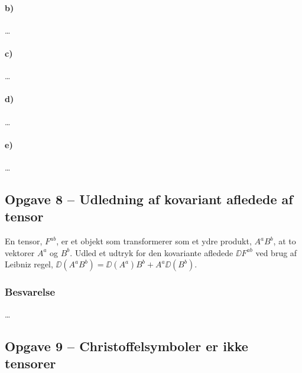 \documentclass[../main.tex]{subfiles}
\begin{document}
\paragraph{b)}

\ldots



\paragraph{c)}

\ldots



\paragraph{d)}

\ldots



\paragraph{e)}

\ldots




\subsection{Opgave 8 -- Udledning af kovariant afledede af tensor}
\setcounter{subsection}{8}
\setcounter{equation}{0}

En tensor, $F^{ab}$, er et objekt som transformerer som et ydre produkt, $A^a B^b$, at to vektorer $A^a$ og $B^b$. Udled et udtryk for den kovariante afledede $\DD F^{ab}$ ved brug af Leibniz regel, $\DD(A^a B^b) = \DD(A^a)B^b + A^a \DD (B^b)$.


\subsubsection{Besvarelse}

\ldots




\subsection{Opgave 9 -- Christoffelsymboler er ikke tensorer}
\setcounter{subsection}{9}
\setcounter{equation}{0}
\end{document}
